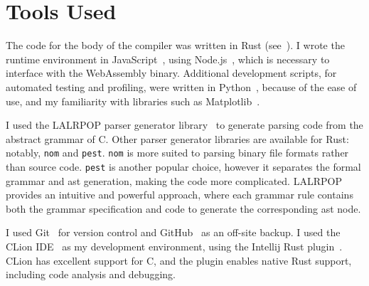 \documentclass[00-main.tex]{subfiles}
\begin{document}
\section{Tools Used}

The code for the body of the compiler was written in Rust (see~).
I wrote the runtime environment in JavaScript~, using Node.js~, which is necessary to interface with the Web\-Assembly binary.
Additional development scripts, for automated testing and profiling, were written in Python~, because of the ease of use, and my familiarity with libraries such as Matplotlib~.

I used the LALRPOP parser generator library~ to generate parsing code from the abstract grammar of C.
Other parser generator libraries are available for Rust: notably, \texttt{nom} and \texttt{pest}.
\texttt{nom} is more suited to parsing binary file formats rather than source code.
\texttt{pest} is another popular choice, however it separates the formal grammar and \gls{ast} generation, making the code more complicated.
LALRPOP provides an intuitive and powerful approach, where each grammar rule contains both the grammar specification and code to generate the corresponding \gls{ast} node.

I used Git~ for version control and GitHub~ as an off-site backup.
I used the CLion IDE~ as my development environment, using the Intellij Rust plugin~.
CLion has excellent support for C, and the plugin enables native Rust support, including code analysis and debugging.
\end{document}
